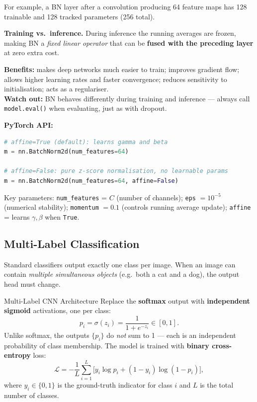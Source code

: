 \documentclass[11pt,a4paper]{article}
\begin{document}
For example, a BN layer after a convolution producing 64 feature maps has 128 trainable and 128 tracked parameters (256 total).

\textbf{Training vs.\ inference.} During inference the running averages are frozen, making BN a \emph{fixed linear operator} that can be \textbf{fused with the preceding layer} at zero extra cost.

\begin{insightbox}
\textbf{Benefits:} makes deep networks much easier to train; improves gradient flow; allows higher learning rates and faster convergence; reduces sensitivity to initialisation; acts as a regulariser.\\
\textbf{Watch out:} BN behaves differently during training and inference — always call \texttt{model.eval()} when evaluating, just as with dropout.
\end{insightbox}

\textbf{PyTorch API:}
\begin{lstlisting}[language=Python, caption={BatchNorm2d in PyTorch}]
# affine=True (default): learns gamma and beta
m = nn.BatchNorm2d(num_features=64)

# affine=False: pure z-score normalisation, no learnable params
m = nn.BatchNorm2d(num_features=64, affine=False)
\end{lstlisting}
Key parameters: \texttt{num\_features} = $C$ (number of channels); \texttt{eps} $= 10^{-5}$ (numerical stability); \texttt{momentum} $= 0.1$ (controls running average update); \texttt{affine} = learns $\gamma, \beta$ when \texttt{True}.

\subsection{Multi-Label Classification}

Standard classifiers output exactly one class per image. When an image can contain \emph{multiple simultaneous objects} (e.g.\ both a cat and a dog), the output head must change.

\begin{defbox}{Multi-Label CNN Architecture}
Replace the \textbf{softmax} output with \textbf{independent sigmoid} activations, one per class:
\[
p_i = \sigma(z_i) = \frac{1}{1+e^{-z_i}} \in [0,1].
\]
Unlike softmax, the outputs $\{p_i\}$ do \emph{not} sum to 1 — each is an independent probability of class membership. The model is trained with \textbf{binary cross-entropy} loss:
\[
\mathcal{L} = -\frac{1}{L}\sum_{i=1}^{L}\bigl[y_i \log p_i + (1-y_i)\log(1-p_i)\bigr],
\]
where $y_i \in \{0,1\}$ is the ground-truth indicator for class $i$ and $L$ is the total number of classes.
\end{defbox}
\end{document}
